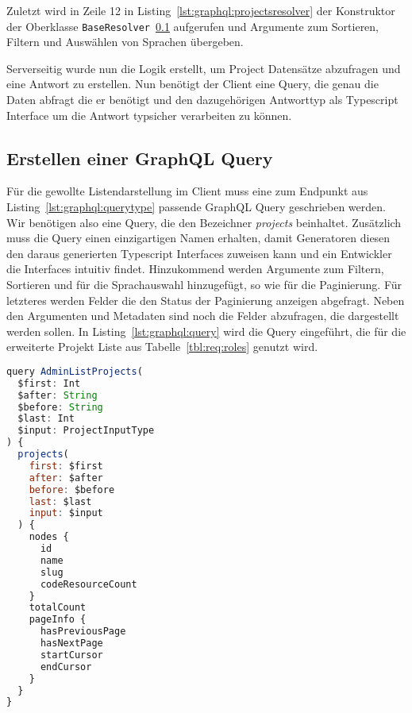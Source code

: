Zuletzt wird in Zeile 12 in Listing~\ref{lst:graphql:projectsresolver} der Konstruktor der Oberklasse \lstinline|BaseResolver|~\ref{} aufgerufen und  Argumente zum Sortieren, Filtern und Auswählen von Sprachen übergeben.

Serverseitig wurde nun die Logik erstellt, um Project Datensätze abzufragen und eine Antwort zu erstellen.
Nun benötigt der Client eine Query, die genau die Daten abfragt die er benötigt und den dazugehörigen Antworttyp als Typescript Interface um die Antwort typsicher verarbeiten zu können.

\subsection{Erstellen einer GraphQL Query}
Für die gewollte Listendarstellung im Client muss eine zum Endpunkt aus Listing~\ref{lst:graphql:querytype} passende GraphQL Query geschrieben werden. Wir benötigen also eine Query, die den Bezeichner \emph{projects} beinhaltet. Zusätzlich muss die Query einen einzigartigen Namen erhalten, damit Generatoren diesen den daraus generierten Typescript Interfaces zuweisen kann und ein Entwickler die Interfaces intuitiv findet. Hinzukommend werden Argumente zum Filtern, Sortieren und für die Sprachauswahl hinzugefügt, so wie für die Paginierung. Für letzteres werden Felder die den Status der Paginierung anzeigen abgefragt. Neben den Argumenten und Metadaten 
sind noch die Felder abzufragen, die dargestellt werden sollen.
In Listing~\ref{lst:graphql:query} wird die Query eingeführt, die für die erweiterte Projekt Liste aus Tabelle~\ref{tbl:req:roles} genutzt wird.

\begin{lstlisting}[language=JavaScript,float=h!,caption={GraphQL Query für eine paginierte Listendarstellung mit Möglichkeit des Filterns, der Sortierung und der Sprachauswahl}, label={lst:graphql:query}]
query AdminListProjects(
  $first: Int
  $after: String
  $before: String
  $last: Int
  $input: ProjectInputType
) {
  projects(
    first: $first
    after: $after
    before: $before
    last: $last
    input: $input
  ) {
    nodes {
      id
      name
      slug
      codeResourceCount
    }
	totalCount
	pageInfo {
	  hasPreviousPage
	  hasNextPage
	  startCursor
	  endCursor
	}
  }
}
\end{lstlisting}


